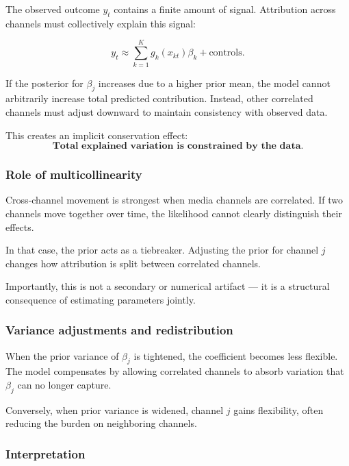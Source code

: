 \documentclass{article}
\begin{document}
The observed outcome $y_t$ contains a finite amount of signal.
Attribution across channels must collectively explain this signal:

\begin{equation}
y_t \approx \sum_{k=1}^K g_k(x_{kt}) \beta_k + \text{controls}.
\end{equation}

If the posterior for $\beta_j$ increases
due to a higher prior mean,
the model cannot arbitrarily increase total predicted contribution.
Instead, other correlated channels must adjust downward
to maintain consistency with observed data.

This creates an implicit conservation effect:
\begin{equation}
\textbf{Total explained variation is constrained by the data.}
\end{equation}

\subsubsection*{Role of multicollinearity}

Cross-channel movement is strongest when media channels are correlated.
If two channels move together over time,
the likelihood cannot clearly distinguish their effects.

In that case, the prior acts as a tiebreaker.
Adjusting the prior for channel $j$
changes how attribution is split between correlated channels.

Importantly, this is not a secondary or numerical artifact —
it is a structural consequence of estimating parameters jointly.

\subsubsection*{Variance adjustments and redistribution}

When the prior variance of $\beta_j$ is tightened,
the coefficient becomes less flexible.
The model compensates by allowing correlated channels
to absorb variation that $\beta_j$ can no longer capture.

Conversely, when prior variance is widened,
channel $j$ gains flexibility,
often reducing the burden on neighboring channels.

\subsubsection*{Interpretation}
\end{document}
